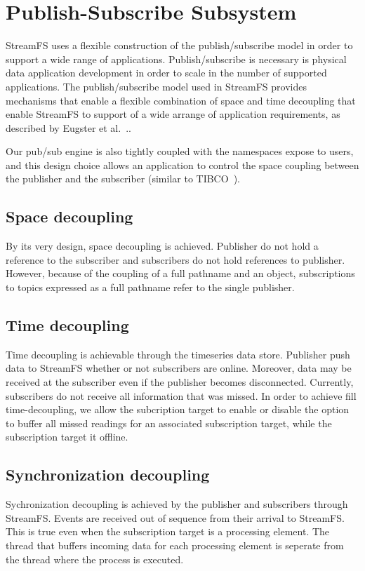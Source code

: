 \section{Publish-Subscribe Subsystem}

StreamFS uses a flexible construction of the publish/subscribe model in order to support a wide range of applications.  
Publish/subscribe is necessary is physical data application development in order to scale in the number of supported
applications.  The publish/subscribe model used in StreamFS provides mechanisms that enable a flexible combination 
of space and time decoupling that enable StreamFS to support of a wide arrange of application requirements, as described by
Eugster et al.~\cite{eugster}..

Our pub/sub engine is also tightly coupled with the namespaces expose to users, and this design choice allows an application
to control the space coupling between the publisher and the subscriber (similar to TIBCO~\cite{tibco}).

\subsection{Space decoupling}
By its very design, space decoupling is achieved.  Publisher do not hold a reference to the subscriber and subscribers do not
hold references to publisher.  However, because of the coupling of a full pathname and an object, subscriptions to topics
expressed as a full pathname refer to the single publisher.

\subsection{Time decoupling}
Time decoupling is achievable through the timeseries data store.  Publisher push data to StreamFS whether or not subscribers are
online.  Moreover, data may be received at the subscriber even if the publisher becomes disconnected.  Currently, subscribers do
not receive all information that was missed.  In order to achieve fill time-decoupling, we allow the subcription
target to enable or disable the option to buffer all missed readings for an associated subscription target, while the subscription
target it offline.

\subsection{Synchronization decoupling}
Sychronization decoupling is achieved by the publisher and subscribers through StreamFS.  Events are received out of sequence
from their arrival to StreamFS.  This is true even when the subscription target is a processing element.  The thread that buffers
incoming data for each processing element is seperate from the thread where the process is executed.
